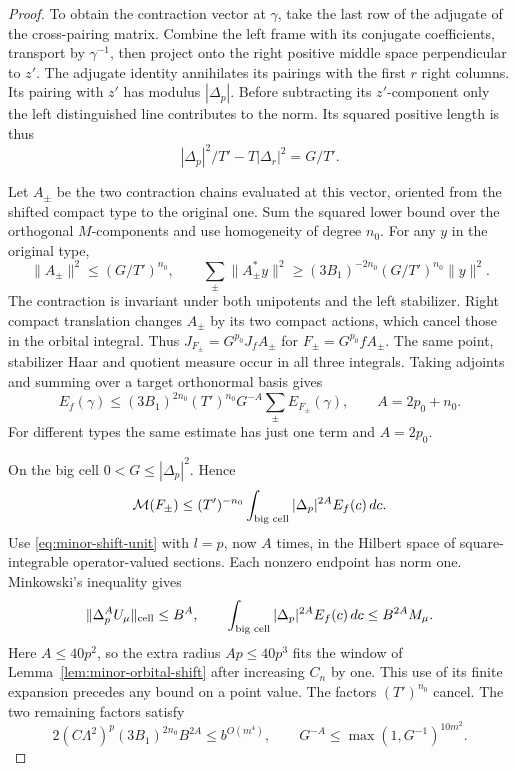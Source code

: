 \begin{proof}
To obtain the contraction vector at \(\gamma\), take the last row of the
adjugate of the cross-pairing matrix. Combine the left frame with
its conjugate coefficients, transport by \(\gamma^{-1}\), then
project onto the right positive middle space perpendicular to \(z'\).
The adjugate identity annihilates its pairings with the first \(r\)
right columns. Its pairing with \(z'\) has modulus \(|\Delta_p|\).
Before subtracting its \(z'\)-component only the left distinguished
line contributes to the norm. Its squared positive length is thus
\[
               |\Delta_p|^2/T'-T|\Delta_r|^2=G/T' .
\]

Let \(A_\pm\) be the two contraction chains evaluated at this vector,
oriented from the shifted compact type to the original one. Sum the
squared lower bound over the orthogonal \(M\)-components and use
homogeneity of degree \(n_0\). For any \(y\) in the original type,
\[
 \|A_\pm\|^2\le(G/T')^{n_0},\qquad
 \sum_\pm\|A_\pm^*y\|^2\ge (3B_1)^{-2n_0}(G/T')^{n_0}\|y\|^2 .
\]
The contraction is invariant under both unipotents and the left
stabilizer. Right compact translation changes \(A_\pm\) by its
two compact actions, which cancel those in the orbital integral.
Thus \(J_{F_\pm}=G^{p_0}J_f A_\pm\) for \(F_\pm=G^{p_0}f A_\pm\).
The same point, stabilizer Haar and quotient measure occur in all
three integrals. Taking adjoints and summing over a target
orthonormal basis gives
\[
 E_f(\gamma)\le(3B_1)^{2n_0}(T')^{n_0}G^{-A}
                 \sum_\pm E_{F_\pm}(\gamma),\qquad A=2p_0+n_0.
\]
For different types the same estimate has just one term and \(A=2p_0\).

On the big cell \(0<G\le|\Delta_p|^2\). Hence
\[
 {\cal M}(F_\pm)\le (T')^{-n_0}
       \int_{\text{big cell}}|\Delta_p|^{2A}E_f(c)\,dc .
\]
Use \eqref{eq:minor-shift-unit} with \(l=p\), now \(A\) times,
in the Hilbert space of square-integrable operator-valued sections.
Each nonzero endpoint has norm one. Minkowski's inequality gives
\[
 \|\Delta_p^A U_\mu\|_{\rm cell}\le B^A,\qquad
 \int_{\text{big cell}}|\Delta_p|^{2A}E_f(c)\,dc\le B^{2A}M_\mu .
\]
Here \(A\le40p^2\), so the extra radius \(Ap\le40p^3\) fits
the window of Lemma~\ref{lem:minor-orbital-shift} after increasing
\(C_n\) by one. This use of its finite expansion precedes any
bound on a point value. The factors \((T')^{n_0}\) cancel.
The two remaining factors satisfy
\[
    2(C\Lambda^2)^p(3B_1)^{2n_0}B^{2A}\le b^{O(m^4)},\qquad
                   G^{-A}\le\max(1,G^{-1})^{10m^2}.
\]


\end{proof}
